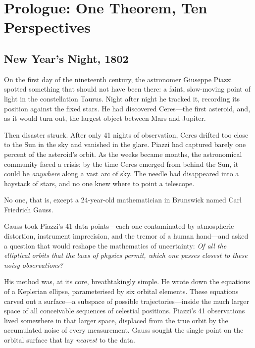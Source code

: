 \section{Prologue: One Theorem, Ten Perspectives}

\subsection*{New Year's Night, 1802}

On the first day of the nineteenth century, the astronomer Giuseppe Piazzi
spotted something that should not have been there: a faint, slow-moving
point of light in the constellation Taurus. Night after night he tracked
it, recording its position against the fixed stars.  He had discovered
Ceres---the first asteroid, and, as it would turn out, the largest object
between Mars and Jupiter.

Then disaster struck.  After only 41 nights of observation, Ceres
drifted too close to the Sun in the sky and vanished in the glare.
Piazzi had captured barely one percent of the asteroid's orbit.  As the
weeks became months, the astronomical community faced a crisis: by the
time Ceres emerged from behind the Sun, it could be \emph{anywhere} along
a vast arc of sky.  The needle had disappeared into a haystack of stars,
and no one knew where to point a telescope.

No one, that is, except a 24-year-old mathematician in Brunswick named
Carl Friedrich Gauss.

Gauss took Piazzi's 41 data points---each one contaminated by
atmospheric distortion, instrument imprecision, and the tremor of a
human hand---and asked a question that would reshape the mathematics of
uncertainty: \emph{Of all the elliptical orbits that the laws of physics
permit, which one passes closest to these noisy observations?}

His method was, at its core, breathtakingly simple.  He wrote down the
equations of a Keplerian ellipse, parameterised by six orbital elements.
These equations carved out a surface---a subspace of possible
trajectories---inside the much larger space of all conceivable sequences
of celestial positions.  Piazzi's 41 observations lived somewhere in that
larger space, displaced from the true orbit by the accumulated noise of
every measurement.  Gauss sought the single point on the orbital surface
that lay \emph{nearest} to the data.

